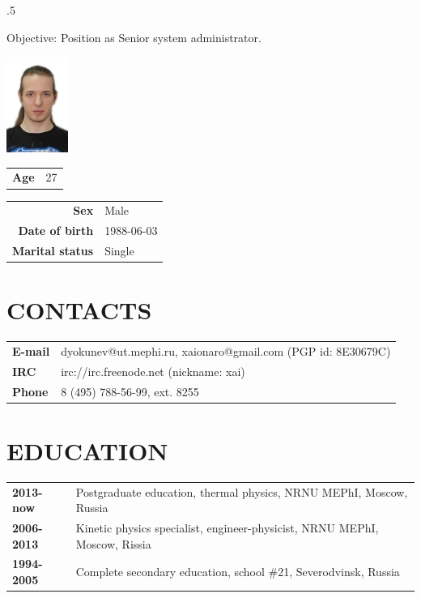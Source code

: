 \address{115522, 2 Moskvorechie Street (building 1), Moscow, Russia}


\begin{resume}
\vspace{0.1in}
\moveleft.5\sectionwidth\centerline{Objective: Position as Senior system administrator.}  

\vspace{-6.5em}
\flushright
\includegraphics[width=20mm]{photo.jpg}\\
\begin{tabular}{ll}
 {\bf Age} & 27\\
\end{tabular}
\flushleft

\vspace{-5.5em}
\begin{tabular}{rl}
 {\bf Sex}            & Male\\
 {\bf Date of birth}  & 1988-06-03\\
 {\bf Marital status} & Single\\
\end{tabular}

\section{CONTACTS}
\vspace{0.1in} 
\begin{tabular}{ll}
 {\bf E-mail} & dyokunev@ut.mephi.ru, xaionaro@gmail.com (PGP id: 8E30679C)\\
 {\bf IRC}    & irc://irc.freenode.net (nickname: xai)\\
 {\bf Phone}  & 8 (495) 788-56-99, ext. 8255\\
\end{tabular}

\section{EDUCATION}
\vspace{0.1in} 
\begin{tabular}{ll}
 {\bf 2013-now } & Postgraduate education, thermal physics, NRNU MEPhI, Moscow, Russia\\
 {\bf 2006-2013} & Kinetic physics specialist, engineer-physicist, NRNU MEPhI, Moscow, Rissia\\
 {\bf 1994-2005} & Complete secondary education, school \#21, Severodvinsk, Russia\\
\end{tabular}


\end{resume}
